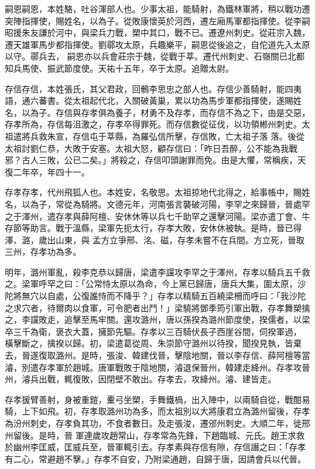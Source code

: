 \begin{pinyinscope}
 嗣恩嗣恩，本姓駱，吐谷渾部人也。少事太祖，能騎射，為鐵林軍將，稍以戰功遷突陣指揮使，賜姓名，以為子。從敗康懷英於河西，遷左廂馬軍都指揮使。從李嗣昭援朱友謙於河中，與梁兵力戰，槊中其口，戰不已。遷遼州刺史。從莊宗入魏，遷天雄軍馬步都指揮使。劉鄩攻太原，兵趣樂平，嗣恩從後追之，自佗道先入太原以守。鄩兵去，
 嗣恩亦以兵會莊宗于魏，從戰于莘。遷代州刺史、石嶺關已北都知兵馬使、振武節度使。天祐十五年，卒于太原。追贈太尉。



 存信存信，本姓張氏，其父君政，回鶻李思忠之部人也。存信少善騎射，能四夷語，通六蕃書。從太祖起代北，入關破黃巢，累以功為馬步軍都指揮使，遂賜姓名，以為子。存信與存孝俱為養子，材勇不及存孝，而存信不為之下，由是交惡，存孝所為，存信每沮激之，存孝卒得罪死。而存信數從征伐，以功領郴州刺史。太祖遣將兵救朱宣，存信屯于莘縣，為羅弘信所擊，存信敗，亡太祖子落
 落。後從太祖討劉仁恭，大敗于安塞。太祖大怒，顧存信曰：「昨日吾醉，公不能為我戰邪？古人三敗，公已二矣。」將殺之，存信叩頭謝罪而免。由是大懼，常稱疾，天復二年卒，年四十一。



 存孝存孝，代州飛狐人也。本姓安，名敬思。太祖掠地代北得之，給事帳中，賜姓名，以為子，常從為騎將。文德元年，河南張言襲破河陽，李罕之來歸晉，晉處罕之于澤州，遣存孝與薛阿檀、安休休等以兵七千助罕之還擊河陽。梁亦遣丁會、牛存節等助言。戰于溫縣，梁軍先扼太行，存孝大敗，安休休被執。是時，晉已得澤、潞，歲出山東，與
 孟方立爭邢、洺、磁，存孝未嘗不在兵間。方立死，晉取三州，存孝功為多。



 明年，潞州軍亂，殺李克恭以歸唐，梁遣李讜攻李罕之于澤州，存孝以騎兵五千救之。梁軍呼罕之曰：「公常恃太原以為命，今上黨已歸唐，唐兵大集，圍太原，沙陀將無穴以自處，公復誰恃而不降乎？」存孝以精騎五百繞梁柵而呼曰：「我沙陀之求穴者，待爾肉以食軍，可令肥者出鬥！」梁驍將鄧季筠引軍出戰，存孝舞槊擒之，李讜敗走，追擊至馬牢關。還攻潞州，唐以孫揆為潞州節度使，揆儒者，以梁卒三千為衛，褒衣大蓋，擁節先驅。存孝以三百騎伏長子西崖谷間，伺揆軍過，
 橫擊斷之，擒揆以歸。初，梁遣葛從周、朱崇節守潞州以待揆，聞揆見執，皆棄去，晉遂復取潞州。是時，張浚、韓建伐晉，擊陰地關，晉以李存信、薛阿檀等當濬，別遣存孝軍於趙城。唐軍戰敗于陰地關，濬退保晉州，韓建走絳州。存孝攻晉州，濬兵出戰，輒復敗，因閉壁不敢出。存孝去，攻絳州。濬、建皆走。



 存孝猨臂善射，身被重鎧，櫜弓坐槊，手舞鐵楇，出入陣中，以兩騎自從，戰酣易騎，上下如飛。初，存孝取潞州功為多，而太祖別以大將康君立為潞州留後，存孝為汾州刺史，存孝負其功，不食者數日。及走張浚，遷邠州刺史。大順二年，徙邢州留後。是時，晉
 軍連歲攻趙常山，存孝常為先鋒，下趙臨城、元氏。趙王求救於幽州李匡威，匡威兵至，晉軍輒引去。存孝素與存信有隙，存信譖之曰：「存孝有二心，常避趙不擊。」存孝不自安，乃附梁通趙，自歸于唐，因請會兵以代晉。




\end{pinyinscope}
